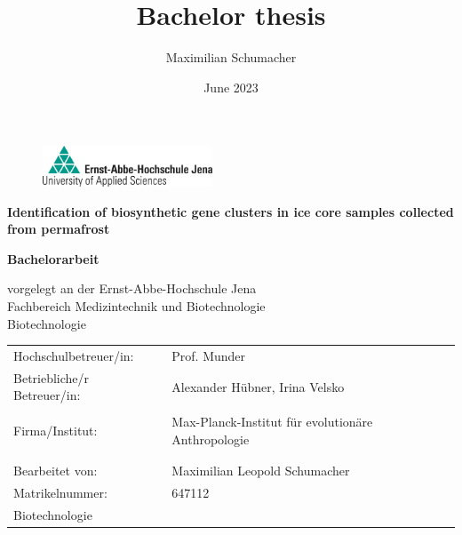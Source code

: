 \documentclass[12pt, a4paper]{scrreprt}
\title{Bachelor thesis}
\author{Maximilian Schumacher}
\date{June 2023}
\begin{document}
\begin{titlepage}
    \begin{figure}
        \hfill 
        \includegraphics[width=0.45\textwidth]{Logo_EAH.jpg}
        \label{fig:eah_logo}
    \end{figure}
    \begin{center}
        \vspace*{2cm}
        
        \LARGE
        \textbf{Identification of biosynthetic gene clusters in ice core samples collected from permafrost}
            
        \vspace{2cm}
        \large
        \textbf{Bachelorarbeit}

        \vspace{2cm}
        \normalsize
        vorgelegt an der Ernst-Abbe-Hochschule Jena \\
        Fachbereich Medizintechnik und Biotechnologie\\
        \vspace{0.5cm}
        Biotechnologie
    \end{center}
    \vfill
    \begin{table}[b]
        \begin{tabular}{l l}
            Hochschulbetreuer/in: & Prof. Munder \\
            Betriebliche/r Betreuer/in: & Alexander Hübner, Irina Velsko \\
             &  \\
            Firma/Institut: & Max-Planck-Institut für evolutionäre Anthropologie \\
             &  \\
             &  \\
            Bearbeitet von: & Maximilian Leopold Schumacher \\
            Matrikelnummer: &  647112\\
            Biotechnologie &  \\
        \end{tabular}
    \end{table}
\end{titlepage}

\tableofcontents
\setcounter{page}{2}
\end{document}
